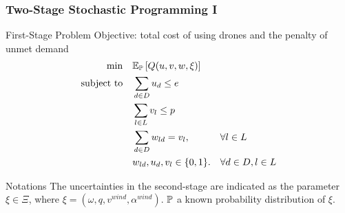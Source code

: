 \documentclass[aspectratio=169]{beamer}
\begin{document}
\begin{frame}
\frametitle{Two-Stage Stochastic Programming I}
\begin{alertblock}{First-Stage Problem}
\small
Objective: total cost of using drones and the penalty of unmet demand
\scriptsize
\vspace{-3pt}
    \begin{subequations} \label{formulation:1stStage}
        \begin{align}
            \min \quad & \mathbb{E}_{\mathbb{P}} \left[ Q(u,v,w,\xi) \right] && \label{objective:1stStageObj} \\
            \operatorname{subject~to} \quad & \sum_{d \in D} u_d \leq e     && \label{constraint:Num_Depot} \\
                             & \sum_{l \in L} v_l \leq p     && \label{constraint:Num_Launch} \\
                             & \sum_{d \in D} w_{ld} = v_l,  && \forall l \in L \label{constraint:LaunchPointtoOneDepot} \\
                             & w_{ld}, u_d, v_l \in \{0,1\}. && \forall d \in D, l \in L \label{constraint:wBinary}
        \end{align}
    \end{subequations}
\end{alertblock}
\begin{block}{Notations}
    The uncertainties in the second-stage are indicated as the parameter $\xi \in \Xi$, where $\xi = \left( \omega, q , v^{wind} , \alpha^{wind} \right)$. $\mathbb{P}$ a known probability distribution of $\xi$.   
\end{block}
\end{frame}
\end{document}
